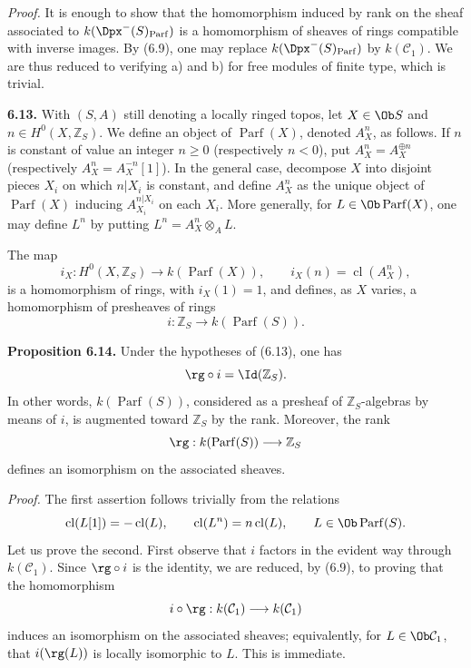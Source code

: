 \documentclass[11pt]{article}
\newcommand{\cl}{\operatorname{cl}}
\newcommand{\Parf}{\operatorname{Parf}}
\begin{document}
\providecommand{\End}{\operatorname{End}}
\providecommand{\tr}{\operatorname{tr}}

\emph{Proof.} It is enough to show that the homomorphism induced by rank on the sheaf associated to \(k(\Dpx^-(S)_{\Parf})\) is a homomorphism of sheaves of rings compatible with inverse images. By (6.9), one may replace \(k(\Dpx^-(S)_{\Parf})\) by \(k(\mathcal C_1)\). We are thus reduced to verifying a) and b) for free modules of finite type, which is trivial.

\textbf{6.13.} With \((S,A)\) still denoting a locally ringed topos, let \(X\in\Ob S\) and \(n\in H^0(X,\mathbb Z_S)\). We define an object of \(\Parf(X)\), denoted \(A_X^n\), as follows. If \(n\) is constant of value an integer \(n\geq0\) (respectively \(n<0\)), put \(A_X^n=A_X^{\oplus n}\) (respectively \(A_X^n=A_X^{-n}[1]\)). In the general case, decompose \(X\) into disjoint pieces \(X_i\) on which \(n|X_i\) is constant, and define \(A_X^n\) as the unique object of \(\Parf(X)\) inducing \(A_{X_i}^{n|X_i}\) on each \(X_i\). More generally, for \(L\in\Ob\Parf(X)\), one may define \(L^n\) by putting \(L^n=A_X^n\otimes_A L\).

The map
\[
  i_X:H^0(X,\mathbb Z_S)\longrightarrow k(\Parf(X)),
  \qquad i_X(n)=\cl(A_X^n),
\]
is a homomorphism of rings, with \(i_X(1)=1\), and defines, as \(X\) varies, a homomorphism of presheaves of rings
\[
  i:\mathbb Z_S\longrightarrow k(\Parf(S)).
\]

\textbf{Proposition 6.14.} Under the hypotheses of (6.13), one has
\[
  \rg\circ i=\Id(\mathbb Z_S).
\]
In other words, \(k(\Parf(S))\), considered as a presheaf of \(\mathbb Z_S\)-algebras by means of \(i\), is augmented toward \(\mathbb Z_S\) by the rank. Moreover, the rank
\[
  \rg:k(\Parf(S))\longrightarrow \mathbb Z_S
\]
defines an isomorphism on the associated sheaves.

\emph{Proof.} The first assertion follows trivially from the relations
\[
  \cl(L[1])=-\cl(L),\qquad \cl(L^n)=n\cl(L),
  \qquad L\in\Ob\Parf(S).
\]
Let us prove the second. First observe that \(i\) factors in the evident way through \(k(\mathcal C_1)\). Since \(\rg\circ i\) is the identity, we are reduced, by (6.9), to proving that the homomorphism
\[
  i\circ\rg:k(\mathcal C_1)\longrightarrow k(\mathcal C_1)
\]
induces an isomorphism on the associated sheaves; equivalently, for \(L\in\Ob\mathcal C_1\), that \(i(\rg(L))\) is locally isomorphic to \(L\). This is immediate.
\end{document}
